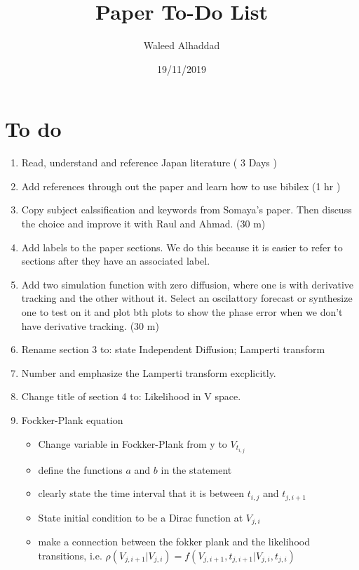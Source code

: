 \documentclass[a4paper, 12pt]{article}
\title{Paper To-Do List}
\author{Waleed Alhaddad}
\date{19/11/2019}
\begin{document}
\maketitle



\section{To do}
\begin{enumerate}
\item Read, understand and reference Japan literature ( 3 Days )
\item Add references through out the paper and learn how to use bibilex (1 hr )
\item Copy subject calssification and keywords from Somaya's paper. Then discuss the choice and improve it with Raul and Ahmad. (30 m)
\item Add labels to the paper sections. We do this because it is easier to refer to sections after they have an associated label.
\item Add two simulation function with zero diffusion, where one is with derivative tracking and the other without it. Select an oscilattory forecast or synthesize one to test on it and plot bth plots to show the phase error when we don't have derivative tracking. (30 m)
\item Rename section 3 to: state Independent Diffusion; Lamperti transform
\item Number and emphasize the Lamperti transform excplicitly.
\item Change title of section 4 to: Likelihood in V space.
\item Fockker-Plank equation 
\begin{itemize}
\item Change variable in Fockker-Plank from y to $V_{t_{i,j}}$
\item define the functions $a$ and $b$ in the statement
\item  clearly state the time interval that it is between $t_{i,j}$ and $t_{j,i+1}$
\item State initial condition to be a Dirac function at $V_{j,i}$
\item make a connection between the fokker plank and the likelihood transitions, i.e. $\rho(V_{j,i+1}| V_{j,i})  = f(V_{j,i+1}, t_{j,i+1}|V_{j,i}, t_{j,i} )$
\end{itemize}


\end{enumerate}
\end{document}
